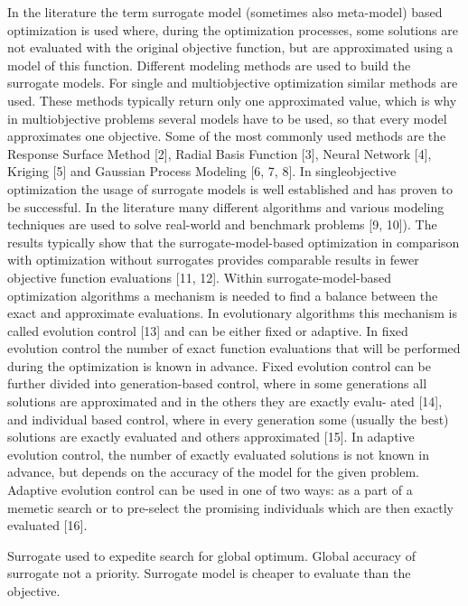         In the literature the term surrogate model (sometimes also meta-model) based optimization is 
        used where, during the optimization processes, some solutions are not evaluated with the original 
        objective function, but are approximated using a model of this function. Different modeling methods 
        are used to build the surrogate models. For single and multiobjective optimization similar methods are used. 
        These methods typically return only one approximated value, which is why in multiobjective problems several 
        models have to be used, so that every model approximates one objective. Some of the most commonly used methods 
        are the Response Surface Method [2], Radial Basis Function [3], Neural Network [4], Kriging [5] and 
        Gaussian Process Modeling [6, 7, 8]. 
        In singleobjective optimization the usage of surrogate models is well established and has proven to be successful. 
        In the literature many different algorithms and various modeling techniques are used to solve real-world and 
        benchmark problems [9, 10]). The results typically show that the surrogate-model-based optimization in 
        comparison with optimization without surrogates provides comparable results in fewer objective function 
        evaluations [11, 12].
        Within surrogate-model-based optimization algorithms a mechanism is needed to find a balance between the 
        exact and approximate evaluations. In evolutionary algorithms this mechanism is called evolution control [13] 
        and can be either fixed or adaptive. In fixed evolution control the number of exact function evaluations that 
        will be performed during the optimization is known in advance. Fixed evolution control can be further divided 
        into generation-based control, where in some generations all solutions are approximated and in the others they 
        are exactly evalu- ated [14], and individual based control, where in every generation some (usually the best) 
        solutions are exactly evaluated and others approximated [15].
        In adaptive evolution control, the number of exactly evaluated solutions is not known in advance,
        but depends on the accuracy of the model for the given problem. Adaptive evolution control can be used in one of two ways: 
        as a part of a memetic search or to pre-select the promising individuals which are then exactly evaluated [16].
        \cite{MlakarPTF15}

        Surrogate used to expedite search for global optimum. Global accuracy of surrogate
        not a priority. Surrogate model is cheaper to evaluate than the objective.

